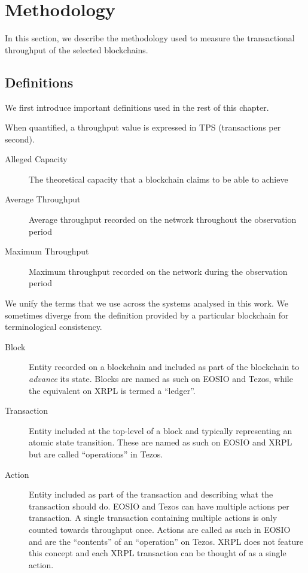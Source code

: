 
\section{Methodology}
\label{sec:4:methodology}
In this section, we describe the methodology used to measure the transactional throughput of the selected blockchains.

\subsection{Definitions}
We first introduce important definitions used in the rest of this chapter.

When quantified, a throughput value is expressed in TPS (transactions per second).
\begin{description}
\item[Alleged Capacity] The theoretical capacity that a blockchain claims to be able to achieve
\item[Average Throughput] Average throughput recorded on the network throughout the observation period
\item[Maximum Throughput] Maximum throughput recorded on the network during the observation period
\end{description}

We unify the terms that we use across the systems analysed in this work.
We sometimes diverge from the definition provided by a particular blockchain for terminological consistency.

\begin{description}
\item[Block] Entity recorded on a blockchain and included as part of the blockchain to \emph{advance} its state. Blocks are named as such on EOSIO and Tezos, while the equivalent on XRPL is termed a ``ledger''.
\item[Transaction] Entity included at the top-level of a block and typically representing an atomic state transition. These are named as such on EOSIO and XRPL but are called ``operations'' in Tezos.
\item[Action] Entity included as part of the transaction and describing what the transaction should do. EOSIO and Tezos can have multiple actions per transaction. A single transaction containing multiple actions is only counted towards throughput once.
Actions are called as such in EOSIO and are the ``contents'' of an ``operation'' on Tezos. XRPL does not feature this concept and each XRPL transaction can be thought of as a single action.
\end{description}


